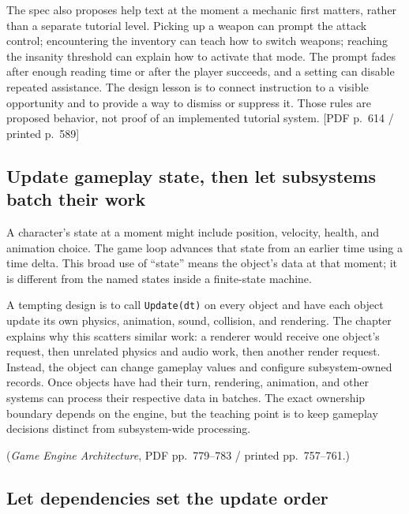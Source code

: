 The spec also proposes help text at the moment a mechanic first matters, rather than a separate tutorial level. Picking up a weapon can prompt the attack control; encountering the inventory can teach how to switch weapons; reaching the insanity threshold can explain how to activate that mode. The prompt fades after enough reading time or after the player succeeds, and a setting can disable repeated assistance. The design lesson is to connect instruction to a visible opportunity and to provide a way to dismiss or suppress it. Those rules are proposed behavior, not proof of an implemented tutorial system. {[}PDF p.~614 / printed p.~589{]}

\subsection{Update gameplay state, then let subsystems batch their work}\label{05-engine-i-ch014-update-gameplay-state-then-let-subsystems-batch-their-work}

\hypertarget{05-engine-i-ch014-update-gameplay-state-then-let-subsystems-batch-their-work}{}

A character's state at a moment might include position, velocity, health, and animation choice. The game loop advances that state from an earlier time using a time delta. This broad use of ``state'' means the object's data at that moment; it is different from the named states inside a finite-state machine.

A tempting design is to call \texttt{Update(dt)} on every object and have each object update its own physics, animation, sound, collision, and rendering. The chapter explains why this scatters similar work: a renderer would receive one object's request, then unrelated physics and audio work, then another render request. Instead, the object can change gameplay values and configure subsystem-owned records. Once objects have had their turn, rendering, animation, and other systems can process their respective data in batches. The exact ownership boundary depends on the engine, but the teaching point is to keep gameplay decisions distinct from subsystem-wide processing.

(\emph{Game Engine Architecture}, PDF pp.~779--783 / printed pp.~757--761.)

\subsection{Let dependencies set the update order}\label{05-engine-i-ch014-let-dependencies-set-the-update-order}

